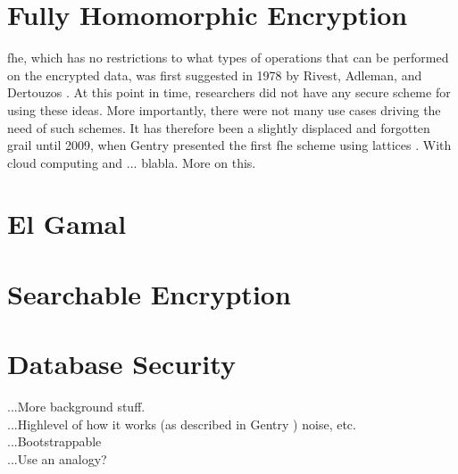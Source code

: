 \section{Fully Homomorphic Encryption}

\Gls{fhe}, which has no restrictions to what types of operations that can be performed on the encrypted data, was first suggested in 1978 by Rivest, Adleman, and Dertouzos \cite{rivest1978data}. At this point in time, researchers did not have any secure scheme for using these ideas. More importantly, there were not many use cases driving the need of such schemes. It has therefore been a slightly displaced and forgotten grail until 2009, when Gentry presented the first \gls{fhe} scheme using lattices \cite{Gentry_first_lattices}. With cloud computing and ... blabla. More on this. %

\section{El Gamal}

\section{Searchable Encryption}

\section{Database Security}

...More background stuff.\\
...Highlevel of how it works (as described in Gentry \cite{Gentry_computing_arb_func_enc_data}) noise, etc.\\
...Bootstrappable\\
...Use an analogy?\\
